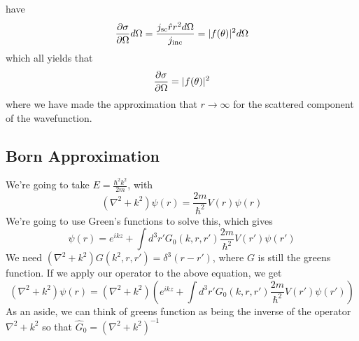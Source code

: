 \documentclass{article}
\theoremstyle{definition}
\begin{document}
have \begin{equation} \pdv{\sigma}{\Omega}d\Omega=\frac{j_\mathrm{sc}\hat rr^2d\Omega}{j_\mathrm{inc}}=|f(\theta)|^2d\Omega \end{equation} which all yields that \begin{equation} \pdv{\sigma}{\Omega}=|f(\theta)|^2 \end{equation} where we have made the approximation that $r\rightarrow\infty$ for the scattered component of the wavefunction. \subsection{Born Approximation} We're going to take $E=\frac{\hbar^2k^2}{2m}$, with \begin{equation} (\nabla^2+k^2)\psi(r)=\frac{2m}{\hbar^2}V(r)\psi(r) \end{equation} We're going to use Green's functions to solve this, which gives \begin{equation} \psi(r)=e^{ikz}+\int d^3r'G_0(k,r,r')\frac{2m}{\hbar^2}V(r')\psi(r') \end{equation} We need $(\nabla^2+k^2)G(k^2,r,r')=\delta^3(r-r')$, where $G$ is still the greens function. If we apply our operator to the above equation, we get \begin{equation} (\nabla^2+k^2)\psi(r)=(\nabla^2+k^2)\left(e^{ikz}+\int d^3r'G_0(k,r,r')\frac{2m}{\hbar^2}V(r')\psi(r')\right) \end{equation} As an aside, we can think of greens function as being the inverse of the operator $\nabla^2+k^2$ so that $\hat G_0=(\nabla^2+k^2)^{-1}$
\end{document}
